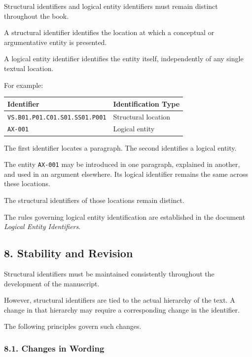 Structural identifiers and logical
entity identifiers must remain
distinct throughout the book.

A structural identifier identifies
the location at which a conceptual
or argumentative entity is presented.

A logical entity identifier identifies
the entity itself, independently
of any single textual location.

For example:

\begin{center}
\begin{tabular}{ll}
    \toprule
    \textbf{Identifier} & \textbf{Identification Type} \\
    \midrule
    \texttt{VS.B01.P01.C01.S01.SS01.P001}
        & Structural location \\
    \texttt{AX-001}
        & Logical entity \\
    \bottomrule
\end{tabular}
\end{center}

The first identifier locates a paragraph.
The second identifies a logical entity.

The entity \texttt{AX-001} may be
introduced in one paragraph, explained
in another, and used in an argument
elsewhere. Its logical identifier
remains the same across these locations.

The structural identifiers of those
locations remain distinct.

The rules governing logical entity
identification are established in
the document \textit{Logical Entity
Identifiers}.


\subsection*{8. Stability and Revision}

Structural identifiers must be
maintained consistently throughout
the development of the manuscript.

However, structural identifiers
are tied to the actual hierarchy
of the text. A change in that
hierarchy may require a corresponding
change in the identifier.

The following principles govern
such changes.

\subsubsection*{8.1. Changes in Wording}

